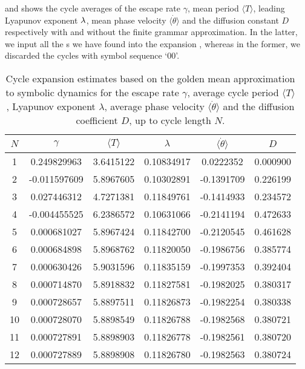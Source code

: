 \documentclass[aip,cha,
reprint,
secnumarabic,
nofootinbib, tightenlines,
nobibnotes, showkeys, showpacs,
superscriptaddress,
]{revtex4-1}
\begin{document}
{ and 
 shows the cycle averages of 
the escape rate $\gamma$, mean period $\langle T \rangle$, leading 
Lyapunov exponent $\lambda$, mean phase velocity 
$\langle \dot{\theta} \rangle$ and the diffusion constant $D$ 
respectively with and without the finite grammar approximation. In 
the latter, we input all the \rpo s we have found into the expansion 
, whereas in the former, we 
discarded the cycles with symbol sequence `00'.

\begin{table}
	\begin{tabular}{c|c|c|c|c|c}
	 $N$ & $\gamma$ & $\langle T \rangle$ & $\lambda$ & $\langle \dot{\theta} \rangle$ & $D$ \\
	\hline
	1 & 0.249829963 & 3.6415122 & 0.10834917 & 0.0222352 & 0.000900 \\
 	2 & -0.011597609 & 5.8967605 & 0.10302891 & -0.1391709 & 0.226199 \\
 	3 & 0.027446312 & 4.7271381 & 0.11849761 & -0.1414933 & 0.234572 \\
 	4 & -0.004455525 & 6.2386572 & 0.10631066 & -0.2141194 & 0.472633 \\
 	5 & 0.000681027 & 5.8967424 & 0.11842700 & -0.2120545 & 0.461628 \\
 	6 & 0.000684898 & 5.8968762 & 0.11820050 & -0.1986756 & 0.385774 \\
 	7 & 0.000630426 & 5.9031596 & 0.11835159 & -0.1997353 & 0.392404 \\
 	8 & 0.000714870 & 5.8918832 & 0.11827581 & -0.1982025 & 0.380317 \\
 	9 & 0.000728657 & 5.8897511 & 0.11826873 & -0.1982254 & 0.380338 \\
 	10 & 0.000728070 & 5.8898549 & 0.11826788 & -0.1982568 & 0.380721 \\
 	11 & 0.000727891 & 5.8898903 & 0.11826778 & -0.1982561 & 0.380720 \\
 	12 & 0.000727889 & 5.8898908 & 0.11826780 & -0.1982563 & 0.380724 \\
 	\end{tabular}
	\caption{Cycle expansion estimates based on the golden mean approximation
              to symbolic dynamics for
             the escape rate $\gamma$, average cycle period $\langle T \rangle$,
             Lyapunov exponent $\lambda$, average phase velocity
             $\langle \dot{\theta} \rangle$ and the diffusion coefficient $D$,
             up to cycle length $N$.}
	\label{t-DynamicalAverages}
\end{table}

}
\end{document}
